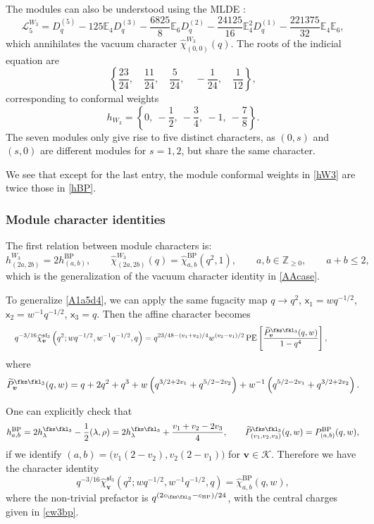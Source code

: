 \documentclass[a4paper,11pt]{article}
\theoremstyle{definition}
\theoremstyle{definition}
\theoremstyle{remark}
\newcommand{\be}{\begin{equation}}
\newcommand{\ee}{\end{equation}}
\newcommand{\beqn}{\begin{eqnarray}}
\newcommand{\eeqn}{\end{eqnarray}}
\begin{document}
 

 
The  modules can also  be understood using the MLDE \cite{Jiang:2024baj}:  
 \be\label{W3MLD}
\mathscr L_5^{W_3}=D_q^{(5)}-125\mathbb{E}_4D_q^{(3)}
-\frac{6825}{8}\mathbb{E}_6D_q^{(2)}
-\frac{24125}{16}\mathbb{E}_4^2D_q^{(1)}
-\frac{221375}{32}\mathbb{E}_4\mathbb{E}_6,
\ee 
which annihilates the vacuum character $\widehat\chi^ {W_3}_{(0,0)}(q)$.
The roots of the indicial equation are
\be
\left\{\frac{23}{24}, \quad \frac{11}{24}, \quad \frac{5}{24}, \quad -\frac{1}{24}, \quad \frac{1}{12}\right\},
\ee
corresponding to conformal weights
\be\label{hW3}
h_{ W_3}=\left\{ 0, \ -\frac{1}{2}, \ -\frac{3}{4}, \ -1, \ -\frac{7}{8} \right\}.
\ee
The seven modules only give rise to five distinct characters, as   $(0,s)$ and $(s,0)$ are different modules for $s=1,2$, but  share the same character.

We see that except for the last entry, the module conformal weights in  \eqref{hW3} are twice   those in  \eqref{hBP}. 

 
\subsubsection{Module character identities }
 The first relation between module characters  is:
\be\label{w3BP}
h^{W_3}_{(2a,2b)} 
=2h^{ \text{BP}}_{(a,b)} , \qquad
 {\widehat\chi}^{W_3}_{(2a,2b)}(q)
= {\widehat\chi}^{ \text{BP}}_{a,b}(q^2,1),  \qquad a,b\in\mathbb Z_{\geq0},\qquad a+b\leq2,
\ee
which is the generalization of the vacuum character identity in \eqref{AAcase}. 

 To generalize \eqref{A1a5d4},  we can apply the same   fugacity map $q\to q^2$, $\mathsf{x}_1=wq^{-1/2}$,  $\mathsf{x}_2=w^{-1}q^{-1/2}$, $\mathsf{x}_3=q$. Then the affine character becomes 
  \beqn
&& q^{-3/16}  \widehat\chi_{\bm v}^{\mathfrak{sl}_3} \left(q^2; wq^{-1/2}, w^{-1}q^{-1/2},q\right) 
= q^{23/48 - (v_1+v_2)/4} w^{(v_2-v_1)/2} \operatorname{PE} \left[ \frac{ \widetilde P^{\fks\fkl_3}_{\bm v}(q,w) }{1 - q^4} \right],
\qquad\qquad
\eeqn 
%
where 
  \be
\widetilde P^{\fks\fkl_3}_{\bm v}(q,w)  = q + 2q^2 + q^3   + w \left( q^{3/2+2v_1} + q^{5/2-2v_2} \right) 
 + w^{-1} \left( q^{5/2-2v_1} + q^{3/2+2v_2} \right).
\ee 

One can  explicitly check that 
  \be
  h^{\mathrm{BP}}_{a,b} 
=2h^{\fks\fkl_3}_\lambda-\frac12(\lambda,\rho)
=2h^{\fks\fkl_3}_\lambda+\frac{v_1+v_2-2v_3}{4}, \qquad 
\widetilde P_{(v_1,v_2,v_3)}^{\fks\fkl_3} (q,w) =  P_{(a,b)}^{ \text{BP}} (q,w)    ,
\ee 
  if we identify $(a,b)=\bigl(v_1(2-v_2),v_2(2-v_1)\bigr)$ for $\bm v\in\mathcal K$.
Therefore we have the character identity
  \be
q^{-3/16}\widehat\chi^{\mathfrak{sl}_3}_{\bm v}
\left(q^2;wq^{-1/2},w^{-1}q^{-1/2},q\right)
=\widehat\chi^{ \text{BP}}_{a,b}(q,w), 
\ee
where the non-trivial prefactor is $q^{( 2c_{\fks\fkl_3}-c_\text{BP})/24}$, with the central charges given in \eqref{cw3bp}.
\end{document}
